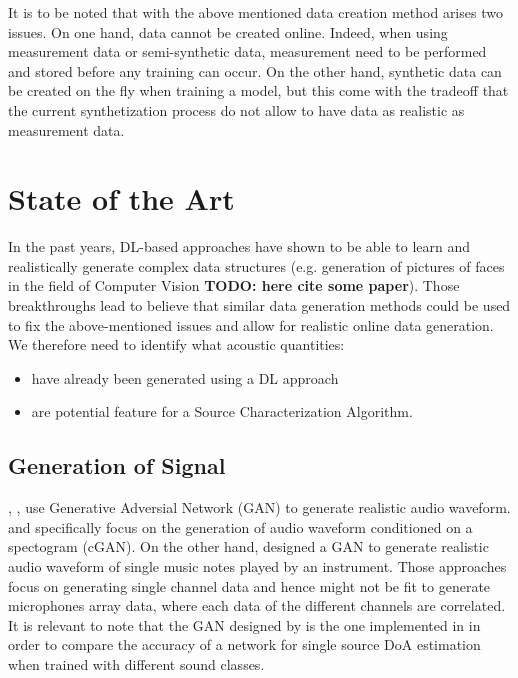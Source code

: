 \documentclass[11pt,a4paper,twoside]{report}
\begin{document}
It is to be noted that with the above mentioned data creation method arises two issues. On one hand, data cannot be created online. Indeed, when using measurement data or semi-synthetic data, measurement need to be performed and stored before any training can occur. On the other hand, synthetic data can be created on the fly when training a model, but this come with the tradeoff that the current synthetization process do not allow to have data as realistic as measurement data.

\section{State of the Art}

In the past years, DL-based approaches have shown to be able to learn and realistically generate complex data structures (e.g. generation of pictures of faces in the field of Computer Vision \textbf{TODO: here cite some paper}). Those breakthroughs lead to believe that similar data generation methods could be used to fix the above-mentioned issues and allow for realistic online data generation. We therefore need to identify what acoustic quantities:
\begin{itemize}
    \item have already been generated using a DL approach
    \item are potential feature for a Source Characterization Algorithm.
\end{itemize}

\subsection{Generation of Signal}

\cite{neekhara2019expediting}, \cite{NEURIPS2019_6804c9bc}, \cite{engel2019gansynth} use Generative Adversial Network (GAN) to generate realistic audio waveform. \cite{neekhara2019expediting} and \cite{NEURIPS2019_6804c9bc} specifically focus on the generation of audio waveform conditioned on a spectogram (cGAN). On the other hand, \cite{engel2019gansynth} designed a GAN to generate realistic audio waveform of single music notes played by an instrument. Those approaches focus on generating single channel data and hence might not be fit to generate microphones array data, where each data of the different channels are correlated. It is relevant to note that the GAN designed by \cite{neekhara2019expediting} is the one implemented in \cite{vargas2021improved} in order to compare the accuracy of a network for single source DoA estimation when trained with different sound classes.
\end{document}

